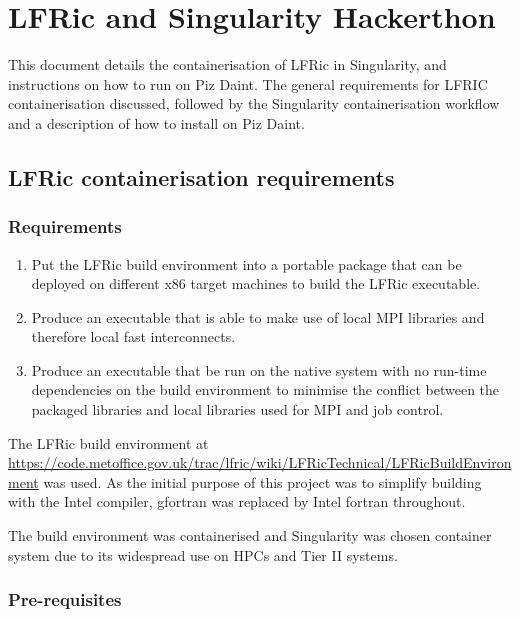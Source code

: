 \documentclass[12pt]{article}
\begin{document}
\section*{LFRic and Singularity Hackerthon}

This document details the containerisation of LFRic in Singularity, and
instructions on how to run on Piz Daint. The general requirements for LFRIC
containerisation discussed, followed by the Singularity containerisation
workflow and a description of how to install on Piz Daint.


\subsection*{LFRic containerisation requirements}

\subsubsection*{Requirements}

\begin{enumerate}
\item Put the LFRic build environment into a portable package that can be deployed on different x86 target machines to build the LFRic executable.

\item Produce an executable that is able to make use of local MPI libraries and therefore local fast interconnects.

\item Produce an executable that be run on the native system with no run-time dependencies on the build environment to minimise the conflict between the packaged libraries and local libraries used for MPI and job control.
\end{enumerate}

The LFRic build environment at\\
\url{https://code.metoffice.gov.uk/trac/lfric/wiki/LFRicTechnical/LFRicBuildEnvironment} was used. As the initial purpose of this project was to simplify building with the Intel compiler, gfortran was replaced by Intel fortran throughout.

The build environment was containerised and Singularity was chosen container system due to its widespread use on HPCs and Tier II systems.

\subsubsection*{Pre-requisites}
\end{document}
